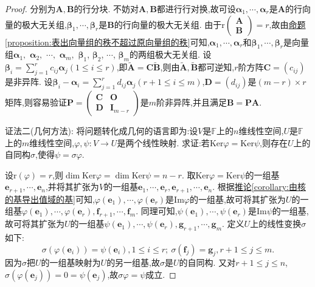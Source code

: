 \documentclass[../../main.tex]{subfiles}
\begin{document}
\begin{proof}
分别为\(\boldsymbol{A},\boldsymbol{B}\)的行分块. 不妨对\(\boldsymbol{A},\boldsymbol{B}\)都进行行对换,故可设\(\boldsymbol{\alpha}_1,\cdots,\boldsymbol{\alpha}_r\)是\(\boldsymbol{A}\)的行向量的极大无关组,\(\boldsymbol{\beta}_1,\cdots,\boldsymbol{\beta}_r\)是\(\boldsymbol{B}\)的行向量的极大无关组. 由于\(\text{r}\begin{pmatrix}\boldsymbol{A}\\\boldsymbol{B}\end{pmatrix}=r\),故由\hyperref[proposition:表出向量组的秩不超过原向量组的秩]{命题\ref{proposition:表出向量组的秩不超过原向量组的秩}}可知,\(\boldsymbol{\alpha}_1,\cdots,\boldsymbol{\alpha}_r\)和\(\boldsymbol{\beta}_1,\cdots,\boldsymbol{\beta}_r\)是向量组$\boldsymbol{\alpha}_1,$ $\boldsymbol{\alpha}_2,$ $\cdots,$ $\boldsymbol{\alpha}_m,$ $\boldsymbol{\beta}_1$, $\boldsymbol{\beta}_2$, $\cdots$, $\boldsymbol{\beta}_m$的两组极大无关组. 设\(\boldsymbol{\beta}_i=\sum_{j = 1}^{r}c_{ij}\boldsymbol{\alpha}_j(1\leqslant  i\leqslant  r)\),即$\widetilde{\boldsymbol{A}}=\boldsymbol{C}\widetilde{\boldsymbol{B}}$,则由$\widetilde{\boldsymbol{A}},\widetilde{\boldsymbol{B}}$都可逆知,\(r\)阶方阵\(\boldsymbol{C}=(c_{ij})\)是非异阵. 设\(\boldsymbol{\beta}_i-\boldsymbol{\alpha}_i=\sum_{j = 1}^{r}d_{ij}\boldsymbol{\alpha}_j(r + 1\leqslant  i\leqslant  m)\),\(\boldsymbol{D}=(d_{ij})\)是\((m - r)\times r\)矩阵,则容易验证\(\boldsymbol{P}=\begin{pmatrix}\boldsymbol{C}&\boldsymbol{O}\\\boldsymbol{D}&\boldsymbol{I}_{m - r}\end{pmatrix}\)是\(m\)阶非异阵,并且满足\(\boldsymbol{B}=\boldsymbol{P}\boldsymbol{A}\).

{\color{blue}证法二(几何方法):}  将问题转化成几何的语言即为:设\(V\)是\(\mathbb{F}\)上的\(n\)维线性空间,\(U\)是\(\mathbb{F}\)上的\(m\)维线性空间,\(\varphi,\psi:V\to U\)是两个线性映射. 求证:若\(\text{Ker}\varphi=\text{Ker}\psi\),则存在\(U\)上的自同构\(\sigma\),使得\(\psi=\sigma\varphi\).

设\(\text{r}(\varphi)=r\),则\(\dim\text{Ker}\varphi=\dim\text{Ker}\psi=n - r\). 取\(\text{Ker}\varphi=\text{Ker}\psi\)的一组基\(\boldsymbol{e}_{r + 1},\cdots,\boldsymbol{e}_n\),并将其扩张为\(V\)的一组基\(\boldsymbol{e}_1,\cdots,\boldsymbol{e}_r,\boldsymbol{e}_{r + 1},\cdots,\boldsymbol{e}_n\). 根据\hyperref[corollary:由核的基导出值域的基]{推论\ref{corollary:由核的基导出值域的基}}可知,\(\varphi(\boldsymbol{e}_1),\cdots,\varphi(\boldsymbol{e}_r)\)是\(\text{Im}\varphi\)的一组基,故可将其扩张为\(U\)的一组基\(\varphi(\boldsymbol{e}_1),\cdots,\varphi(\boldsymbol{e}_r),\boldsymbol{f}_{r + 1},\cdots,\boldsymbol{f}_m\). 同理可知,\(\psi(\boldsymbol{e}_1),\cdots,\psi(\boldsymbol{e}_r)\)是\(\text{Im}\psi\)的一组基,故可将其扩张为\(U\)的一组基\(\psi(\boldsymbol{e}_1),\cdots,\psi(\boldsymbol{e}_r),\boldsymbol{g}_{r + 1},\cdots,\boldsymbol{g}_m\). 定义\(U\)上的线性变换\(\sigma\)如下:
\[
\sigma(\varphi(\boldsymbol{e}_i))=\psi(\boldsymbol{e}_i),1\leqslant  i\leqslant  r;\ \sigma(\boldsymbol{f}_j)=\boldsymbol{g}_j,r + 1\leqslant  j\leqslant  m.
\]
因为\(\sigma\)把\(U\)的一组基映射为\(U\)的另一组基,故\(\sigma\)是\(U\)的自同构. 又对\(r + 1\leqslant  j\leqslant  n\),\(\sigma(\varphi(\boldsymbol{e}_j))=0=\psi(\boldsymbol{e}_j)\),故\(\sigma\varphi=\psi\)成立. 


\end{proof}
\end{document}
